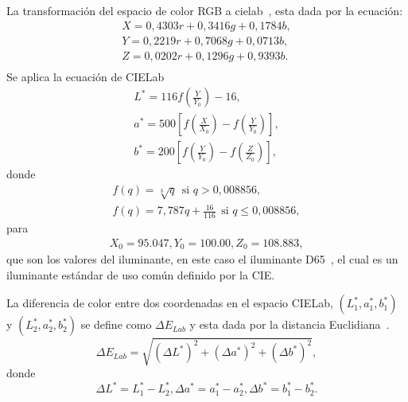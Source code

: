 La transformación del espacio de color RGB a \gls{cielab}~\cite{connolly1997study}, esta dada por la ecuación:
  
  
\begin{equation}
\begin{aligned}
X = 0,4303r + 0,3416g + 0,1784b, \\
Y = 0,2219r + 0,7068g + 0,0713b, \\
Z = 0,0202r + 0,1296g + 0,9393b. \\
\end{aligned}
\end{equation}
Se aplica la ecuación de CIELab
\begin{equation}
\label{formula:cielab}
\begin{aligned}
L^{*} = 116f\left(\frac{Y}{Y_{0}}\right) -16, \\
a^{*} = 500\left[f\left(\frac{X}{X_{0}}\right) - f\left(\frac{Y}{Y_{0}}\right)\right],\\
b^{*} = 200\left[f\left(\frac{Y}{Y_{0}}\right) - f\left(\frac{Z}{Z_{0}}\right)\right],
\end{aligned}
\end{equation}
donde
\begin{equation}
\begin{aligned}
f(q) = \sqrt[3]{q} ~~ \text{si } q> 0,008856,\\
f(q) = 7,787q + \frac{16}{116}  ~~\text{si } q\leq 0,008856,
\end{aligned}
\end{equation}
para
\begin{equation}
\begin{aligned}
X_{0}=95.047, Y_{0}=100.00, Z_{0}=108.883,
\end{aligned}
\end{equation}
que son los valores del iluminante, en este caso el iluminante D65~\cite{connolly1997study}, 
el cual es un iluminante estándar de uso común definido por la CIE.

La diferencia de color entre dos coordenadas en el espacio CIELab, $(L^{*}_{1},a^{*}_{1},b^{*}_{1})$ y $(L^{*}_{2},a^{*}_{2},b^{*}_{2})$ se define como $\Delta E_{Lab}$ y esta dada por la distancia Euclidiana~\cite{robertson1977cie}.
\begin{equation}
\label{formula:eucli}
\Delta E_{Lab} = \sqrt{(\Delta L^{*})^2 + (\Delta a^{*})^2 +(\Delta b^{*})^2},
\end{equation}
donde 
\begin{equation}
\Delta L^{*} = L^{*}_{1} - L^{*}_{2},
\Delta a^{*} = a^{*}_{1} - a^{*}_{2},
\Delta b^{*} = b^{*}_{1} - b^{*}_{2}.
\end{equation}